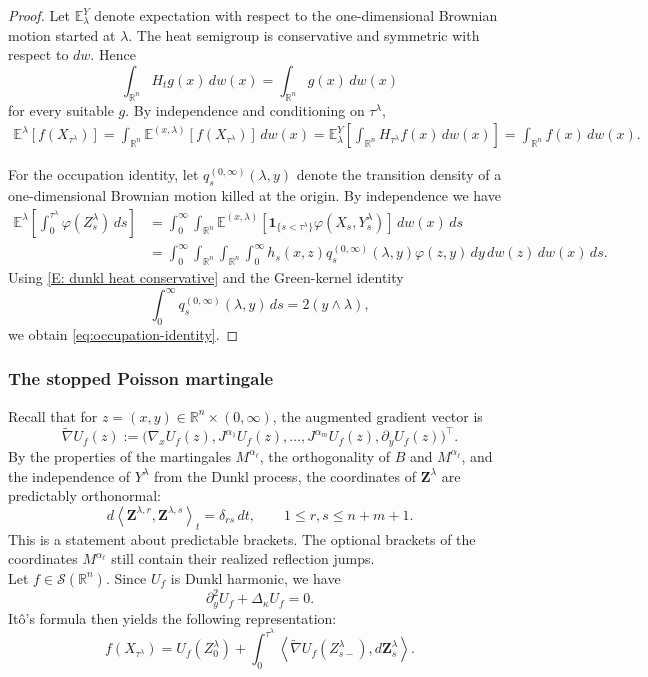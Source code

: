 \documentclass[11pt]{amsart}
\theoremstyle{definition}
\theoremstyle{remark}
\numberwithin{equation}{section}
\newcommand{\R}{\mathbb{R}}
\newcommand{\ind}{\mathbf{1}}
\begin{document}
\begin{proof}
Let $\mathbb E_\lambda^Y$ denote expectation with respect to the
one-dimensional Brownian motion started at $\lambda$. The heat
semigroup is conservative and symmetric with respect to $dw$. Hence
\[
\int_{\R^n}H_tg(x)\,dw(x)
=
\int_{\R^n}g(x)\,dw(x)
\]
for every suitable $g$. By independence and conditioning on
$\tau^\lambda$,
\begin{align*}
\mathbb E^\lambda[f(X_{\tau^\lambda})]
=
\int_{\R^n}\mathbb E^{(x,\lambda)}[f(X_{\tau^\lambda})]\,dw(x)
=
\mathbb E_\lambda^Y\left[
\int_{\R^n}H_{\tau^\lambda}f(x)\,dw(x)
\right]
=
\int_{\R^n}f(x)\,dw(x).
\end{align*}

For the occupation identity, let
$q_s^{(0,\infty)}(\lambda,y)$ denote the transition density of a
one-dimensional Brownian motion killed at the origin. By
independence we have
\begin{align*}
\mathbb E^\lambda\left[
\int_0^{\tau^\lambda}\varphi(Z_s^\lambda)\,ds
\right]
&=
\int_0^\infty\int_{\R^n}
\mathbb E^{(x,\lambda)}\left[
\ind_{\{s<\tau^\lambda\}}\varphi(X_s,Y_s^\lambda)
\right]\,dw(x)\,ds\\
&=
\int_0^\infty\int_{\R^n}\int_{\R^n}\int_0^\infty
h_s(x,z)q_s^{(0,\infty)}(\lambda,y)\varphi(z,y)
\,dy\,dw(z)\,dw(x)\,ds.
\end{align*}
Using \eqref{E: dunkl heat conservative} and the Green-kernel identity
\[
\int_0^\infty q_s^{(0,\infty)}(\lambda,y)\,ds
=2(y\wedge\lambda),
\]
we obtain \eqref{eq:occupation-identity}.
\end{proof}

\subsubsection{The stopped Poisson martingale}
Recall that for $z=(x,y)\in\R^n\times(0,\infty)$, the augmented gradient vector is
\[
\widetilde\nabla U_f(z)
:=
\bigl(
\nabla_xU_f(z),
J^{\alpha_1}U_f(z),\ldots,J^{\alpha_m}U_f(z),
\partial_yU_f(z)
\bigr)^\top.
\]
By the properties of the martingales
$M^{\alpha_\ell}$, the orthogonality of $B$ and
$M^{\alpha_\ell}$, and the independence of $Y^\lambda$ from the Dunkl
process, the coordinates of $\mathbf Z^\lambda$ are predictably
orthonormal:
\begin{equation*}
d\left\langle
\mathbf Z^{\lambda,r},\mathbf Z^{\lambda,s}
\right\rangle_t
=\delta_{rs}\,dt,
\qquad
1\leq r,s\leq n+m+1.
\end{equation*}
This is a statement about predictable brackets. The optional brackets
of the coordinates $M^{\alpha_\ell}$ still contain their realized
reflection jumps. \\
Let $f\in\mathcal S(\R^n)$. Since $U_f$ is Dunkl harmonic, we have
\[
\partial_y^2U_f+\Delta_\kappa U_f=0.
\]
It\^o's formula then yields the following representation:
\begin{equation}
f(X_{\tau^\lambda})
=
U_f(Z_0^\lambda)
+
\int_0^{\tau^\lambda}
\left\langle\widetilde\nabla U_f(Z_{s-}^\lambda),d\mathbf Z_s^\lambda\right\rangle.
\label{E: ito}
\end{equation}
\end{document}
